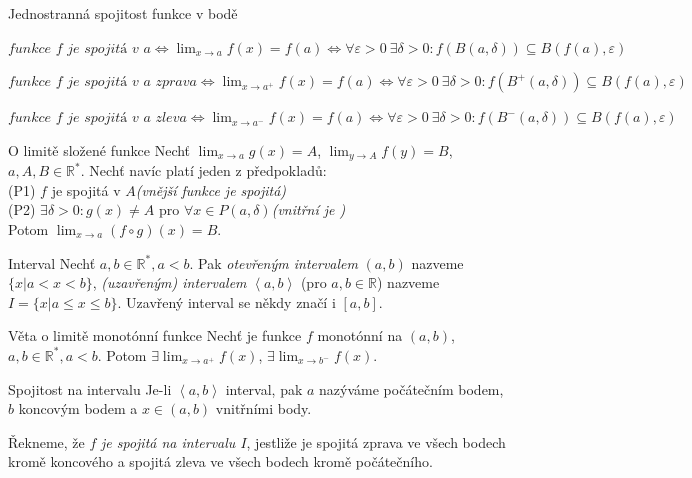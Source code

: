 \begin{definiceN}{Jednostranná spojitost funkce v bodě}
\begin{pitemize}
	\item $\textit{funkce f je spojitá v a} \Leftrightarrow \lim_{x \rightarrow a} f(x)=f(a) \Leftrightarrow \forall \varepsilon>0~\exists \delta >0: f(B(a, \delta)) \subseteq B(f(a), \varepsilon)$
	\item $\textit{funkce f je spojitá v a zprava} \Leftrightarrow \lim_{x \rightarrow a^{+}} f(x)=f(a) \Leftrightarrow \forall \varepsilon>0~\exists \delta >0: f(B^{+}(a, \delta)) \subseteq B(f(a), \varepsilon)$
	\item $\textit{funkce f je spojitá v a zleva} \Leftrightarrow \lim_{x \rightarrow a^{-}} f(x)=f(a) \Leftrightarrow \forall \varepsilon>0~\exists \delta >0: f(B^{-}(a, \delta)) \subseteq B(f(a), \varepsilon)$
\end{pitemize}
\end{definiceN}

\begin{vetaN}{O limitě složené funkce}
Nechť $\lim_{x \rightarrow a} g(x) = A$, $\lim_{y \rightarrow A} f(y) = B$, $a, A, B \in \mathbb{R}^{*}$. Nechť navíc platí jeden z předpokladů:\\
(P1) $f$ je spojitá v $A$\hfill \textit{(vnější funkce je spojitá)}\\
(P2) $\exists \delta > 0: g(x) \neq A$ pro $\forall x \in P(a, \delta)$\hfill \textit{(vnitřní je )}\\
Potom $\lim_{x \rightarrow a} (f \circ g)(x) = B$.
\end{vetaN}

\begin{definiceN}{Interval}
Nechť $a, b \in \mathbb{R}^{*}, a < b$. Pak \emph{otevřeným intervalem} $(a, b)$ nazveme $\{x | a<x<b\}$, \emph{(uzavřeným) intervalem} $\left<a, b\right>$ (pro $a, b \in \mathbb{R}$) nazveme $I=\{x | a \le x \le b\}$. Uzavřený interval se někdy značí i $[a,b]$.
\end{definiceN}

\begin{vetaN}{Věta o limitě monotónní funkce}
Nechť je funkce $f$ monotónní na $(a, b)$, $a, b \in \mathbb{R}^{*}, a < b$. Potom $\exists \lim_{x \rightarrow a^{+}} f(x)$, $\exists \lim_{x \rightarrow b^{-}} f(x)$.
\end{vetaN}

\begin{definiceN}{Spojitost na intervalu}
Je-li $\left<a, b\right>$ interval, pak $a$ nazýváme počátečním bodem, $b$ koncovým bodem a $x \in (a, b)$ vnitřními body.

Řekneme, že $f$ \emph{je spojitá na intervalu $I$}, jestliže je spojitá zprava ve všech bodech kromě koncového a spojitá zleva ve všech bodech kromě počátečního.
\end{definiceN}

